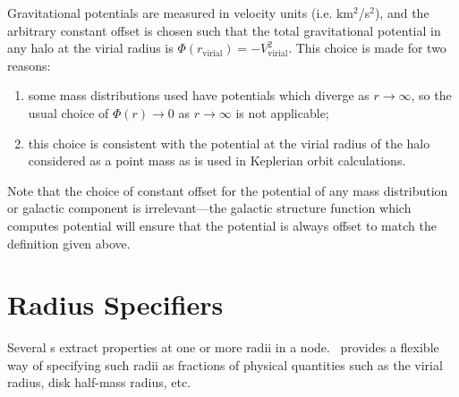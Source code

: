 Gravitational potentials are measured in velocity units (i.e. km$^2$/s$^2$), and the arbitrary constant offset is chosen such that the total gravitational potential in any halo at the virial radius is $\Phi(r_\mathrm{virial})=-V_\mathrm{virial}^2$. This choice is made for two reasons:
\begin{enumerate}
\item some mass distributions used have potentials which diverge as $r\rightarrow\infty$, so the usual choice of $\Phi(r) \rightarrow 0$ as $r \rightarrow \infty$ is not applicable;
\item this choice is consistent with the potential at the virial radius of the halo considered as a point mass as is used in Keplerian orbit calculations.
\end{enumerate}
Note that the choice of constant offset for the potential of any mass distribution or galactic component is irrelevant---the galactic structure function which computes potential will ensure that the potential is always offset to match the definition given above.

\section{Radius Specifiers}\label{sec:radiusSpecifiers}

Several s extract properties at one or more radii in a node. \glc\ provides a flexible way of specifying such radii as fractions of physical quantities such as the virial radius, disk half-mass radius, etc.

